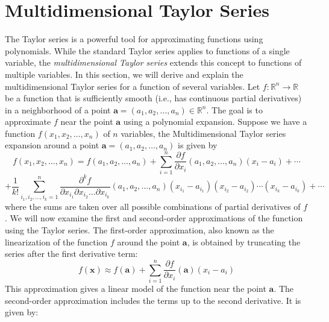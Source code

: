 \section{Multidimensional Taylor Series}
\noindent The Taylor series is a powerful tool for approximating functions using polynomials. 
While the standard Taylor series applies to functions of a single variable, the \textit{multidimensional Taylor series} extends this concept to functions of multiple variables. 
In this section, we will derive and explain the multidimensional Taylor series for a function of several variables.
Let \( f \colon \mathbb{R}^n \to \mathbb{R} \) be a function that is sufficiently smooth (i.e., has continuous partial derivatives) in a neighborhood of a point \( \mathbf{a} = (a_1, a_2, \dots, a_n) \in \mathbb{R}^n \). 
The goal is to approximate \( f \) near the point \( \mathbf{a} \) using a polynomial expansion.
Suppose we have a function $ f(x_1, x_2, \dots, x_n) $ of $n$ variables, the Multidimensional Taylor series expansion around a point $\mathbf{a} = (a_1, a_2, \dots, a_n)$ is given by
\begin{equation*}
f(x_1, x_2, \dots, x_n) = f(a_1, a_2, \dots, a_n) + \sum_{i=1}^{n} \frac{\partial f}{\partial x_i} (a_1, a_2, \dots, a_n) (x_i - a_i) + \cdots
\end{equation*}
\[+ \frac{1}{k!} \sum_{i_1, i_2, \dots, i_k = 1}^{n} \frac{\partial^k f}{\partial x_{i_1} \partial x_{i_2} \dots \partial x_{i_k}} (a_1, a_2, \dots, a_n) (x_{i_1} - a_{i_1})(x_{i_2} - a_{i_2}) \cdots (x_{i_k} - a_{i_k}) + \cdots\]
where the sums are taken over all possible combinations of partial derivatives of \( f \).
\noindent We will now examine the first and second-order approximations of the function using the Taylor series.
The first-order approximation, also known as the linearization of the function \( f \) around the point \( \mathbf{a} \), is obtained by truncating the series after the first derivative term:
\[f(\mathbf{x}) \approx f(\mathbf{a}) + \sum_{i=1}^{n} \frac{\partial f}{\partial x_i}(\mathbf{a}) (x_i - a_i)\]
This approximation gives a linear model of the function near the point \( \mathbf{a} \).
The second-order approximation includes the terms up to the second derivative. It is given by:
